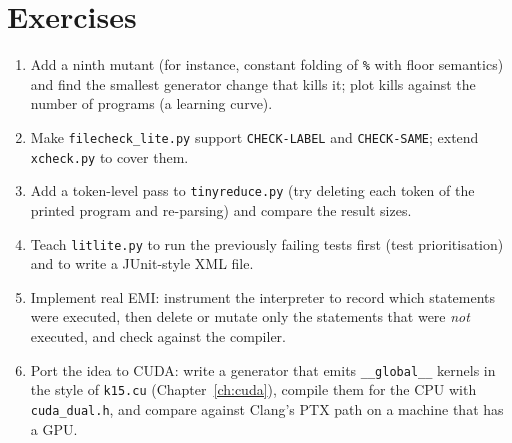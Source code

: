 \documentclass[10pt,a4paper,openany,oneside]{report}
\newcommand{\prio}[1]{\texorpdfstring{\ifcase#1\or{\color{gold}\ding{72}}\or{\color{gold}\ding{72}\ding{72}}\or{\color{gold}\ding{72}\ding{72}\ding{72}}\fi}{}}
\begin{document}
\section{Exercises \prio{2}}
\begin{enumerate}[nosep]
\item Add a ninth mutant (for instance, constant folding of \texttt{\%} with floor semantics) and find the smallest generator change that kills it; plot kills against the number of programs (a learning curve).
\item Make \texttt{filecheck\_lite.py} support \texttt{CHECK-LABEL} and \texttt{CHECK-SAME}; extend \texttt{xcheck.py} to cover them.
\item Add a token-level pass to \texttt{tinyreduce.py} (try deleting each token of the printed program and re-parsing) and compare the result sizes.
\item Teach \texttt{litlite.py} to run the previously failing tests first (test prioritisation) and to write a JUnit-style XML file.
\item Implement real EMI: instrument the interpreter to record which statements were executed, then delete or mutate only the statements that were \emph{not} executed, and check against the compiler.
\item Port the idea to CUDA: write a generator that emits \texttt{\_\_global\_\_} kernels in the style of \texttt{k15.cu} (Chapter~\ref{ch:cuda}), compile them for the CPU with \texttt{cuda\_dual.h}, and compare against Clang's PTX path on a machine that has a GPU.
\end{enumerate}
\end{document}
